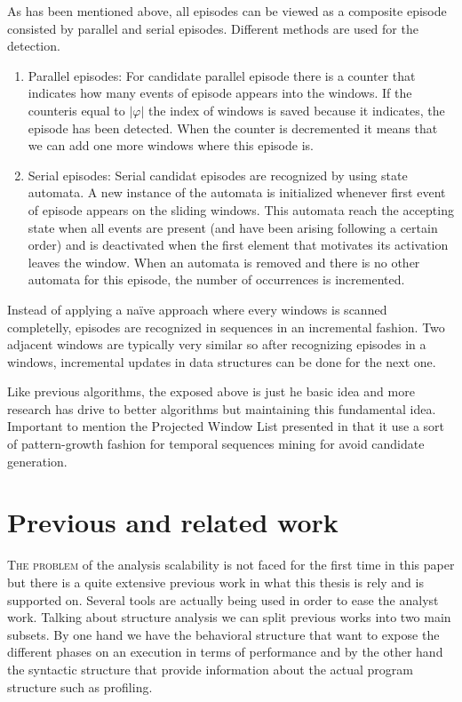 As has been mentioned above, all episodes can be viewed as a composite episode
consisted by parallel and serial episodes. Different methods are used for the
detection. 
\begin{enumerate}[label=\roman*)]
  \item Parallel episodes: For candidate parallel episode there is a counter
    that indicates how many events of episode appears into the windows. If the
    counteris equal to $|\varphi|$ the index of windows is saved because it
    indicates, the episode has been detected. When the counter is decremented
    it means that we can add one more windows where this episode is.
  \item Serial episodes: Serial candidat episodes are recognized by using state
    automata. A new instance of the automata is initialized whenever first event
    of episode appears on the sliding windows. This automata reach the accepting
    state when all events are present (and have been arising following a certain
    order) and is deactivated when the first element
    that motivates its activation leaves the window. When an automata is removed
    and there is no other automata for this episode, the number of occurrences
    is incremented.
\end{enumerate}

Instead of applying a naïve approach where every windows is scanned
completelly, episodes are recognized in sequences in an incremental fashion. 
Two adjacent windows are typically very similar so after
recognizing episodes in a windows, incremental updates in data structures can be
done for the next one.

Like previous algorithms, the exposed above is just he basic idea and more
research has drive to better algorithms but maintaining this fundamental idea.
Important to mention the Projected Window List presented in
\cite{huang2004prowl} that it use a sort of pattern-growth fashion for temporal
sequences mining for avoid candidate generation.


\section{Previous and related work}\label{related_work}

\lettrine{T}{he problem} of the analysis scalability is not faced for the first 
time in 
this paper but there is a quite extensive previous work in what this thesis is 
rely and is 
supported on. Several tools are actually being used in order to ease the analyst
work. Talking about structure analysis we can split previous works into two main
subsets. By one hand we have the behavioral structure that want to expose the
different phases on an execution in terms of performance and by the other hand
the syntactic structure that provide information about the actual program
structure such as profiling.

